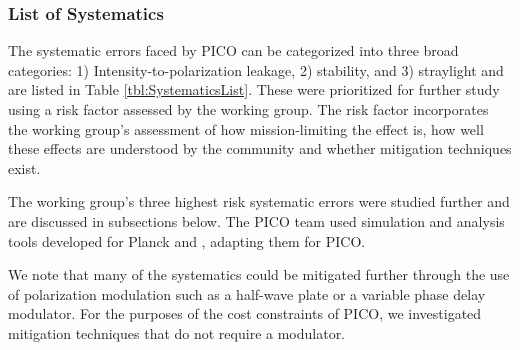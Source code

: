\documentclass[PICOReport.tex]{subfiles}
\begin{document}
\subsubsection{List of Systematics}
The systematic errors faced by PICO can be categorized into three broad categories: 
1) Intensity-to-polarization leakage, 2) stability, and 3)
straylight and are listed in Table \ref{tbl:SystematicsList}.  
These were prioritized for further study using a risk factor assessed by the working group.  
The risk factor incorporates the working group's assessment of how mission-limiting the effect is, how well these effects are understood by the community and whether mitigation techniques exist.  

The working group's three highest risk systematic errors were studied further and are discussed in subsections below.  The PICO team used 
 simulation and analysis tools developed for Planck\cite{plank2015_xii_focalplane} and \core, adapting them for PICO.

We note that many of the systematics could be mitigated further through the use of polarization modulation such as a half-wave plate or a variable phase delay modulator.  
For the purposes of the cost constraints of PICO, we investigated mitigation techniques that do not require a modulator.  
\end{document}
